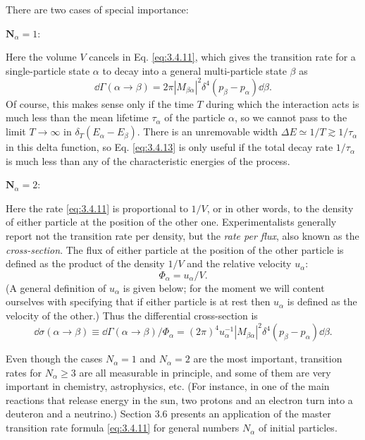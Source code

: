 There are two cases of special importance:

\noindent$\mathbf{N}_{\alpha}=1:$

Here the volume $V$ cancels in Eq. \eqref{eq:3.4.11}, which gives the transition rate for a single-particle
state $\alpha$ to decay into a general multi-particle state $\beta$ as
\begin{equation}
 \dd\Gamma(\alpha\to\beta)=2\pi|M_{\beta\alpha}|^2
 \delta^4(p_\beta-p_\alpha)\dd\beta.
 \tag{3.4.13}\label{eq:3.4.13}
\end{equation}
Of course, this makes sense only if the time $T$ during which the interaction acts is much less
than the mean lifetime $\tau_\alpha$ of the particle $\alpha$, so we cannot pass to the limit
$T\to\infty$ in $\delta_T(E_\alpha-E_\beta)$. There is an unremovable width
$\Delta E\simeq1/T\gtrsim1/\tau_\alpha$ in this delta function, so Eq. \eqref{eq:3.4.13} is only useful
if the total decay rate $1/\tau_\alpha$ is much less than any of the characteristic energies of
the process.

\noindent$\mathbf{N}_{\alpha}=2:$

Here the rate \eqref{eq:3.4.11} is proportional to $1/V$, or in other words, to the density of either
particle at the position of the other one. Experimentalists generally report not the transition
rate per density, but the \emph{rate per flux}, also known as the \emph{cross-section}. The flux
of either particle at the position of the other particle is defined as the product of the density
$1/V$ and the relative velocity $u_\alpha$:
\begin{equation}
 \Phi_\alpha=u_\alpha/V.
 \tag{3.4.14}\label{eq:3.4.14}
\end{equation}
(A general definition of $u_\alpha$ is given below; for the moment we will content ourselves with
specifying that if either particle is at rest then $u_\alpha$ is defined as the velocity of the
other.) Thus the differential cross-section is
\begin{equation}
 \dd\sigma(\alpha\to\beta)\equiv \dd\Gamma(\alpha\to\beta)/\Phi_\alpha
 =(2\pi)^4u_\alpha^{-1}|M_{\beta\alpha}|^2
 \delta^4(p_\beta-p_\alpha)\dd\beta.
 \tag{3.4.15}\label{eq:3.4.15}
\end{equation}

Even though the cases $N_\alpha=1$ and $N_\alpha=2$ are the most important, transition rates
for $N_\alpha\geq3$ are all measurable in principle, and some of them are very important in
chemistry, astrophysics, etc. (For instance, in one of the main reactions that release energy
in the sun, two protons and an electron turn into a deuteron and a neutrino.) Section 3.6 presents
an application of the master transition rate formula \eqref{eq:3.4.11} for general numbers $N_\alpha$ of
initial particles.

